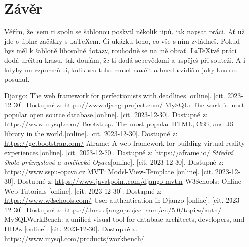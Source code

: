 \documentclass[12pt, a4paper,
twoside,        %
openright
]{report}
\begin{document}
	\chapter*{Závěr}
	Věřím, že jsem ti spolu se šablonou poskytl několik tipů, jak napsat práci. Ať už jde o úplné začátky s \LaTeX{}em. Či ukázku toho, co vše s ním zvládneš. Pokud bys měl k šabloně libovolné dotazy, rouhodně se na mě obrať. \LaTeX tvé práci dodá určitou krásu, tak doufám, že ti dodá sebevědomí a uspěješ při souteži. A i kdyby ne vzpomeň si, kolik ses toho musel naučit a hned uvidíš o jaký kus ses posunul.
	\renewcommand{\bibname}{Seznam použitých informačních zdrojů}
	\begin{thebibliography}{99}
		Django: The web framework for perfectionists with deadlines.[online]. [cit. 2023-12-30]. Dostupné z: \url{https://www.djangoproject.com/}
		MySQL:  The world's most popular open source database.[online]. [cit. 2023-12-30]. Dostupné z: \url{https://www.mysql.com/}
		Bootstrap: The most popular HTML, CSS, and JS library in the world.[online]. [cit. 2023-12-30]. Dostupné z: \url{https://getbootstrap.com/}
		Aframe: A web framework for building virtual reality experiences.[online]. [cit. 2023-12-30]. Dostupné z:  \url{https://aframe.io/}
		 \textit{Střední škola průmyslová a umělecká Opava}[online]. [cit. 2023-12-30]. Dostupné z:  \url{https://www.sspu-opava.cz}
		MVT: Model-View-Template  [online]. [cit. 2023-12-30]. Dostupné z: \url{https://www.javatpoint.com/django-mvtm}
		W3Schools: Online Web Tutorials [online]. [cit. 2023-12-30]. Dostupné z: \url{https://www.w3schools.com/}
		User authentication in Django [online]. [cit. 2023-12-30]. Dostupné z: \url{https://docs.djangoproject.com/en/5.0/topics/auth/}
		MySQLWorkBench: a unified visual tool for database architects, developers, and DBAs [online]. [cit. 2023-12-30]. Dostupné z: \url{https://www.mysql.com/products/workbench/}

	\end{thebibliography}
	\newpage
	\listoffigures
	
	
	
	\appendix %
	
	[\vspace{-22pt}] %
	
	
	
	
\end{document}
